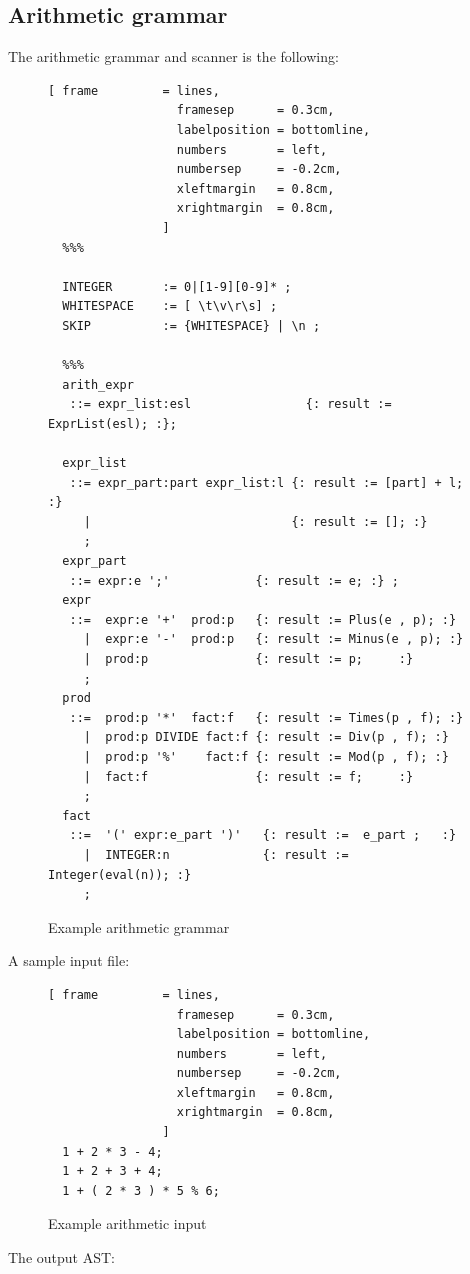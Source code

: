 \subsection{Arithmetic grammar}
The arithmetic grammar and scanner is the following:
\begin{figure}[!ht]
\begin{Verbatim}[ frame         = lines, 
                  framesep      = 0.3cm, 
                  labelposition = bottomline,
                  numbers       = left,
                  numbersep     = -0.2cm,
                  xleftmargin   = 0.8cm,
                  xrightmargin  = 0.8cm,
                ]
  %%%

  INTEGER       := 0|[1-9][0-9]* ;
  WHITESPACE    := [ \t\v\r\s] ;
  SKIP          := {WHITESPACE} | \n ;

  %%%
  arith_expr 
   ::= expr_list:esl                {: result := ExprList(esl); :};

  expr_list 
   ::= expr_part:part expr_list:l {: result := [part] + l; :} 
     |                            {: result := []; :}
     ;
  expr_part 
   ::= expr:e ';'            {: result := e; :} ;
  expr 
   ::=  expr:e '+'  prod:p   {: result := Plus(e , p); :} 
     |  expr:e '-'  prod:p   {: result := Minus(e , p); :} 
     |  prod:p               {: result := p;     :}
     ;
  prod 
   ::=  prod:p '*'  fact:f   {: result := Times(p , f); :}
     |  prod:p DIVIDE fact:f {: result := Div(p , f); :} 
     |  prod:p '%'    fact:f {: result := Mod(p , f); :} 
     |  fact:f               {: result := f;     :}
     ;
  fact 
   ::=  '(' expr:e_part ')'   {: result :=  e_part ;   :} 
     |  INTEGER:n             {: result := Integer(eval(n)); :} 
     ;
\end{Verbatim}
\caption{Example arithmetic grammar}
\label{fig:example_arithmetic_grammer}
\end{figure}
%
A sample input file:
\begin{figure}[!ht]
\begin{Verbatim}[ frame         = lines, 
                  framesep      = 0.3cm, 
                  labelposition = bottomline,
                  numbers       = left,
                  numbersep     = -0.2cm,
                  xleftmargin   = 0.8cm,
                  xrightmargin  = 0.8cm,
                ]
  1 + 2 * 3 - 4;
  1 + 2 + 3 + 4;
  1 + ( 2 * 3 ) * 5 % 6;
\end{Verbatim}
\caption{Example arithmetic input}
\label{fig:example_arithmetic_input}
\end{figure}
%
The output AST:
%

